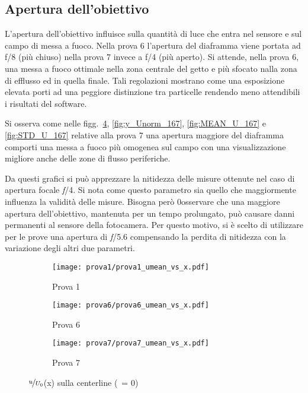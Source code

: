 \documentclass{article} %
\newcommand{\yd}{\nicefrac{\textrm{y}}{\textrm{D}}\ }
\begin{document}
\subsection{Apertura dell'obiettivo}
L'apertura dell'obiettivo influisce sulla quantità di luce che entra nel sensore e sul campo di messa a fuoco. Nella prova 6 l'apertura del diaframma viene portata ad f/8 (più chiuso) nella prova 7 invece a f/4 (più aperto). Si attende, nella prova 6, una messa a fuoco ottimale nella zona centrale del getto e più sfocato nalla zona di efflusso ed in quella finale. Tali regolazioni mostrano come una esposizione elevata porti ad una peggiore distinzione tra particelle rendendo meno attendibili i risultati del software.\par
Si osserva come nelle figg.~\ref{fig:x_Unorm_167}, \ref{fig:y_Unorm_167}, \ref{fig:MEAN_U_167} e  \ref{fig:STD_U_167} relative alla prova 7 una apertura maggiore del diaframma comporti una messa a fuoco più omogenea sul campo con una visualizzazione migliore anche delle zone di flusso periferiche.\par
Da questi grafici si può apprezzare la nitidezza delle misure ottenute nel caso di apertura focale \textit{f}/4. Si nota come questo parametro sia quello che maggiormente influenza la validità delle misure. Bisogna però 0osservare che una maggiore apertura dell'obiettivo, mantenuta per un tempo prolungato, può causare danni permanenti al sensore della fotocamera. Per questo motivo, si è scelto di utilizzare per le prove una apertura di \textit{f}/5.6 compensando la perdita di nitidezza con la variazione degli altri due parametri.
\begin{figure}[b!]
	\centering
	\begin{subfigure}{0.3\textwidth}
		\texttt{[image: prova1/prova1\_umean\_vs\_x.pdf]}
		\label{fig:x_Unorm_1}
		\caption{Prova 1}
	\end{subfigure}
	\begin{subfigure}{0.3\textwidth}
		\texttt{[image: prova6/prova6\_umean\_vs\_x.pdf]}
		\label{fig:x_Unorm_2}
		\caption{Prova 6}
	\end{subfigure}
	\begin{subfigure}{0.3\textwidth}
		\texttt{[image: prova7/prova7\_umean\_vs\_x.pdf]}
		\label{fig:x_Unorm_3}
		\caption{Prova 7}
	\end{subfigure}  
    	\caption{$\nicefrac{u}{U_0}$(x) sulla centerline (\yd = 0)}
	\label{fig:x_Unorm_167}
\end{figure}
\end{document}
